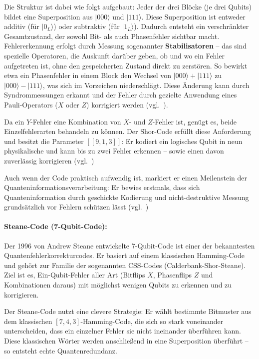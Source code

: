 Die Struktur ist dabei wie folgt aufgebaut: Jeder der drei Blöcke (je drei Qubits) bildet eine Superposition aus \(|000\rangle\) und \(|111\rangle\). Diese Superposition ist entweder additiv (für \(|0_L\rangle\)) oder subtraktiv (für \(|1_L\rangle\)). Dadurch entsteht ein verschränkter Gesamtzustand, der sowohl Bit- als auch Phasenfehler sichtbar macht.
Fehlererkennung erfolgt durch Messung sogenannter \textbf{Stabilisatoren} – das sind spezielle Operatoren, die Auskunft darüber geben, ob und wo ein Fehler aufgetreten ist, ohne den gespeicherten Zustand direkt zu zerstören. So bewirkt etwa ein Phasenfehler in einem Block den Wechsel von \(|000\rangle + |111\rangle\) zu \(|000\rangle - |111\rangle\), was sich im Vorzeichen niederschlägt. Diese Änderung kann durch Syndrommessungen erkannt und der Fehler durch gezielte Anwendung eines Pauli-Operators (\(X\) oder \(Z\)) korrigiert werden (vgl.~\cite[432-433]{nielsen_quantum_2010}).

Da ein \(Y\)-Fehler eine Kombination von \(X\)- und \(Z\)-Fehler ist, genügt es, beide Einzelfehlerarten behandeln zu können. Der Shor-Code erfüllt diese Anforderung und besitzt die Parameter \([[9, 1, 3]]\): Er kodiert ein logisches Qubit in neun physikalische und kann bis zu zwei Fehler erkennen – sowie einen davon zuverlässig korrigieren (vgl.~\cite[10-11]{devitt_quantum_2013})

Auch wenn der Code praktisch aufwendig ist, markiert er einen Meilenstein der Quanteninformationsverarbeitung: Er bewies erstmals, dass sich Quanteninformation durch geschickte Kodierung und nicht-destruktive Messung grundsätzlich vor Fehlern schützen lässt (vgl.~\cite[Seite 432–434]{nielsen_quantum_2010})

\paragraph{Steane-Code (7-Qubit-Code):}

Der 1996 von Andrew Steane entwickelte 7-Qubit-Code ist einer der bekanntesten Quantenfehlerkorrekturcodes. Er basiert auf einem klassischen Hamming-Code und gehört zur Familie der sogenannten CSS-Codes (Calderbank-Shor-Steane). Ziel ist es, Ein-Qubit-Fehler aller Art (Bitflips \(X\), Phasenflips \(Z\) und Kombinationen daraus) mit möglichst wenigen Qubits zu erkennen und zu korrigieren.

Der Steane-Code nutzt eine clevere Strategie: Er wählt bestimmte Bitmuster aus dem klassischen \([7,4,3]\)-Hamming-Code, die sich so stark voneinander unterscheiden, dass ein einzelner Fehler sie nicht ineinander überführen kann. Diese klassischen Wörter werden anschließend in eine Superposition überführt – so entsteht echte Quantenredundanz.

